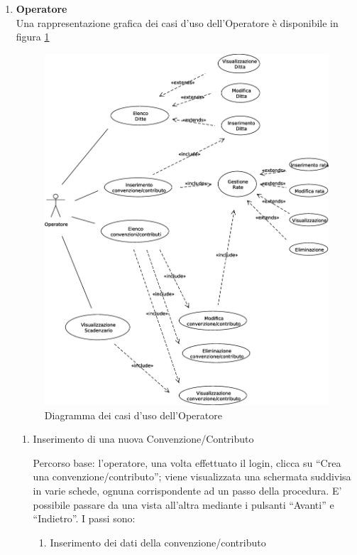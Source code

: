 \begin{enumerate}
\item \textbf{Operatore}\\
Una rappresentazione grafica dei casi d'uso dell'Operatore è disponibile in figura \ref{use_case_diag_operator}
\begin{figure}[h]
  \caption{Diagramma dei casi d'uso dell'Operatore}
  \label{use_case_diag_operator}
  \centering
    \includegraphics[width=1\textwidth]{images/casi_uso_operatore.eps}
\end{figure}

\begin{enumerate}
  \item Inserimento di una nuova Convenzione/Contributo\\ \label{UC_new_contract}
  
  Percorso base:
  l'operatore, una volta effettuato il login, clicca su ``Crea una convenzione/contributo''; viene visualizzata una schermata suddivisa in varie schede,
  ognuna corrispondente ad un passo della procedura. E' possibile passare da una vista all'altra mediante i pulsanti ``Avanti'' e ``Indietro''. I passi sono:
  \begin{enumerate}
    \item Inserimento dei dati della convenzione/contributo\\
      

\end{enumerate}
\end{enumerate}
\end{enumerate}
